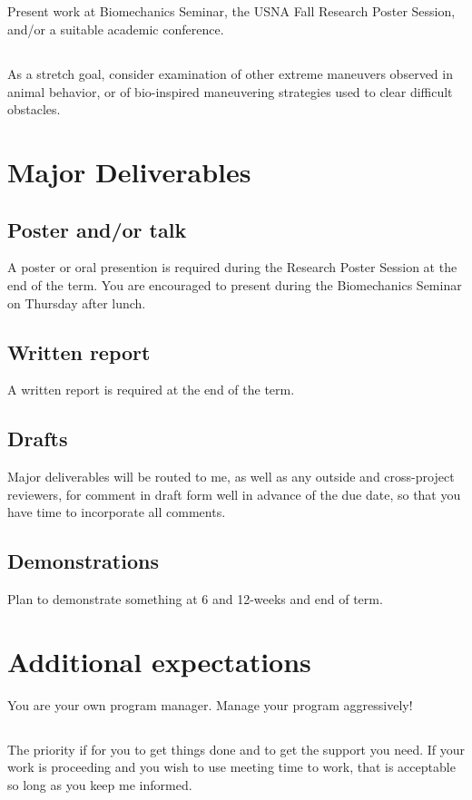 \documentclass[10pt,courier]{navymemo}
\begin{document}
\subsection{} Present work at Biomechanics Seminar, the USNA Fall Research Poster Session, and/or a suitable academic conference. 
\subsection{} As a stretch goal, consider examination of other extreme maneuvers observed in animal behavior, or of bio-inspired maneuvering strategies used to clear difficult obstacles. 

\section{Major Deliverables}
\subsection{Poster and/or talk} A poster or oral presention is required during the Research Poster Session at the end of the term. You are encouraged to present during the Biomechanics Seminar on Thursday after lunch. 
\subsection{Written report} A written report is required at the end of the term. 
\subsection{Drafts} Major deliverables will be routed to me, as well as any outside and cross-project reviewers, for comment in draft form well in advance of the due date, so that you have time to incorporate all comments. 
\subsection{Demonstrations} Plan to demonstrate something at 6 and 12-weeks and end of term. 

\clearpage
\section{Additional expectations} You are your own program manager. Manage your program aggressively!
\subsection{} The priority if for you to get things done and to get the support you need. If your work is proceeding and you wish to use meeting time to work, that is acceptable so long as you keep me informed. 
\end{document}
